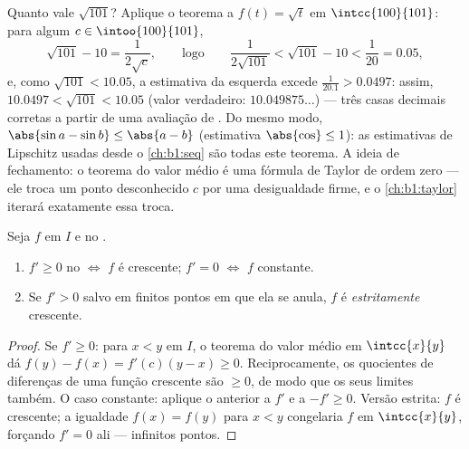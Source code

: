 \begin{example}\label{ex:b1:derivative:mvtestimate}
Quanto vale $\sqrt{101}$? Aplique o teorema a $f(t) = \sqrt t$
em $\intcc{100}{101}$: para algum $c \in \intoo{100}{101}$,
\[
\sqrt{101} - 10 = \frac{1}{2\sqrt c},
\qquad\text{logo}\qquad
\frac{1}{2\sqrt{101}} < \sqrt{101} - 10 < \frac{1}{20} = 0.05 ,
\]
e, como $\sqrt{101} < 10.05$, a estimativa da esquerda excede
$\frac{1}{20.1} > 0.0497$: assim, $10.0497 < \sqrt{101} < 10.05$
(valor verdadeiro: $10.049875\dots$) --- três casas decimais corretas a
partir de uma avaliação de . Do mesmo modo, $\abs{\sin a - \sin b} \leq
\abs{a - b}$ (estimativa $\abs{\cos}\leq 1$): as estimativas de Lipschitz
usadas desde o \cref{ch:b1:seq} são todas este teorema. A ideia de
fechamento: o teorema do valor médio é uma fórmula de Taylor de ordem
zero --- ele troca um ponto desconhecido $c$ por uma desigualdade firme,
e o \cref{ch:b1:taylor} iterará exatamente essa troca.
\end{example}

\begin{corollary}\label{cor:b1:derivative:monotone}
Seja $f$  em $I$ e  no .
\begin{enumerate}
  \item $f' \geq 0$ no  $\iff$ $f$ é crescente; $f' = 0$
        $\iff$ $f$ constante.
  \item Se $f' > 0$ salvo em finitos pontos em que ela se anula,
        $f$ é \emph{estritamente} crescente.
\end{enumerate}
\end{corollary}

\begin{proof}
Se $f' \geq 0$: para $x < y$ em $I$, o teorema do valor médio em
$\intcc{x}{y}$ dá $f(y) - f(x) = f'(c)(y - x) \geq 0$. Reciprocamente,
os quocientes de diferenças de uma função crescente são $\geq 0$, de
modo que os seus limites também. O caso constante: aplique o anterior a
$f'$ e a $-f' \geq 0$. Versão estrita: $f$ é crescente; a igualdade $f(x) =
f(y)$ para $x < y$ congelaria $f$ em $\intcc{x}{y}$, forçando $f' =
0$ ali --- infinitos pontos.
\end{proof}

